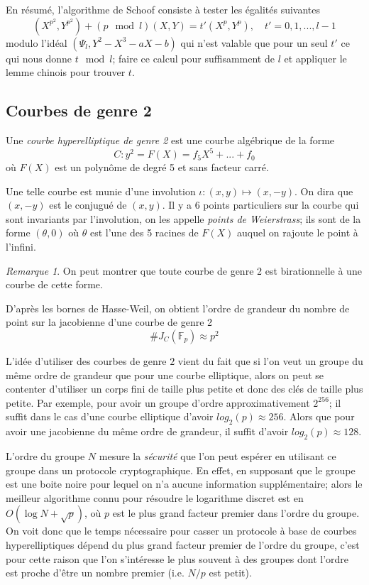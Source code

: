 \documentclass[a4paper]{article}
\theoremstyle{definition}
\theoremstyle{remark}
\newtheorem{remarque}{Remarque}
\numberwithin{equation}{section}
\begin{document}
En résumé, l'algorithme de Schoof consiste à tester les égalités suivantes
\begin{equation}
(X^{p^2},Y^{p^2}) + (p \mod l)(X,Y) = t'(X^p,Y^p), \quad t' = 0,1,...,l-1
\end{equation}
modulo l'idéal $(\Psi_l,Y^2-X^3-aX-b)$ qui n'est valable que pour un seul $t'$ ce qui nous donne $t \mod l$; faire ce calcul pour suffisamment de $l$ et appliquer le lemme chinois pour trouver $t$.

\subsection{Courbes de genre 2}
Une \emph{courbe hyperelliptique de genre 2} est une courbe algébrique de la forme
$$C : y^2 = F(X) = f_5X^5 + ... + f_0$$
où $F(X)$ est un polynôme de degré 5 et sans facteur carré.

Une telle courbe est munie d'une involution $\iota : (x,y) \longmapsto (x,-y)$. On dira que $(x,-y)$ est le conjugué de $(x,y)$. Il y a 6 points particuliers sur la courbe qui sont invariants par l'involution, on les appelle \emph{points de Weierstrass}; ils sont de la forme $(\theta,0)$ où $\theta$ est l'une des 5 racines de $F(X)$ auquel on rajoute le point à l'infini.

\begin{remarque}
On peut montrer que toute courbe de genre 2 est birationnelle à une courbe de cette forme.
\end{remarque}

D'après les bornes de Hasse-Weil, on obtient l'ordre de grandeur du nombre de point sur la jacobienne d'une courbe de genre 2 $$\#J_C(\mathbb{F}_p) \approx p^2$$

L'idée d'utiliser des courbes de genre $2$ vient du fait que si l'on veut un groupe du même ordre de grandeur que pour une courbe elliptique, alors on peut se contenter d'utiliser un corps fini de taille plus petite et donc des clés de taille plus petite. Par exemple, pour avoir un groupe d'ordre approximativement $2^{256}$; il suffit dans le cas d'une courbe elliptique d'avoir $log_2(p) \approx 256$. Alors que pour avoir une jacobienne du même ordre de grandeur, il suffit d'avoir $log_2(p) \approx 128$.

L'ordre du groupe $N$ mesure la \emph{sécurité} que l'on peut espérer en utilisant ce groupe dans un protocole cryptographique. En effet, en supposant que le groupe est une boite noire pour lequel on n'a aucune information supplémentaire; alors le meilleur algorithme connu pour résoudre le logarithme discret est en $O(\log N + \sqrt{p})$, où $p$ est le plus grand facteur premier dans l'ordre du groupe. On voit donc que le temps nécessaire pour casser un protocole à base de courbes hyperelliptiques dépend du plus grand facteur premier de l'ordre du groupe, c'est pour cette raison que l'on s'intéresse le plus souvent à des groupes dont l'ordre est proche d'être un nombre premier (i.e. $N/p$ est petit).
\end{document}
